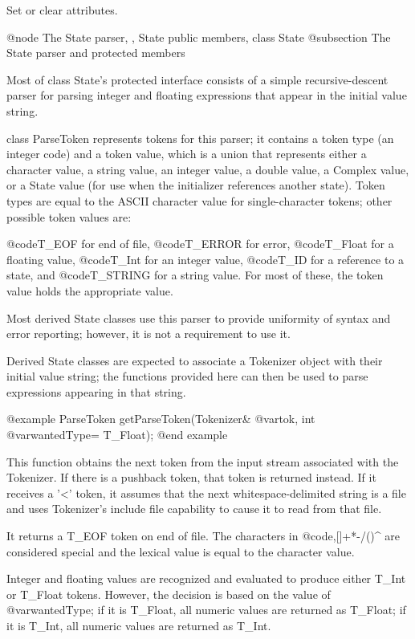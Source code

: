 Set or clear attributes.

@node The State parser,  , State public members, class State
@subsection The State parser and protected members

Most of class State's protected interface consists of a simple
recursive-descent parser for parsing integer and floating expressions
that appear in the initial value string.

class ParseToken represents tokens for this parser; it contains a
token type (an integer code) and a token value, which is a
union that represents either a character value, a string value, an
integer value, a double value, a Complex value, or a State value
(for use when the initializer references another state).  Token
types are equal to the ASCII character value for single-character
tokens; other possible token values are:

@code{T_EOF} for end of file, @code{T_ERROR} for error, @code{T_Float}
for a floating value, @code{T_Int} for an integer value, @code{T_ID}
for a reference to a state, and @code{T_STRING} for a string value.
For most of these, the token value holds the appropriate value.

Most derived State classes use this parser to provide uniformity
of syntax and error reporting; however, it is not a requirement to
use it.

Derived State classes are expected to associate a Tokenizer object
with their initial value string; the functions provided here can
then be used to parse expressions appearing in that string.

@example
ParseToken getParseToken(Tokenizer& @var{tok}, int @var{wantedType}= T_Float);
@end example

This function obtains the next token from the input stream associated
with the Tokenizer.  If there is a pushback token, that token is
returned instead.  If it receives a '<' token, it assumes that the
next whitespace-delimited string is a file and uses Tokenizer's include
file capability to cause it to read from that file.

It returns a T_EOF token on end of file.  The characters in @code{,[]+*-/()^}
are considered special and the lexical value is equal to the character
value.

Integer and floating values are recognized and evaluated to produce
either T_Int or T_Float tokens.  However, the decision is based on
the value of @var{wantedType}; if it is T_Float, all numeric values
are returned as T_Float; if it is T_Int, all numeric values are returned
as T_Int.

